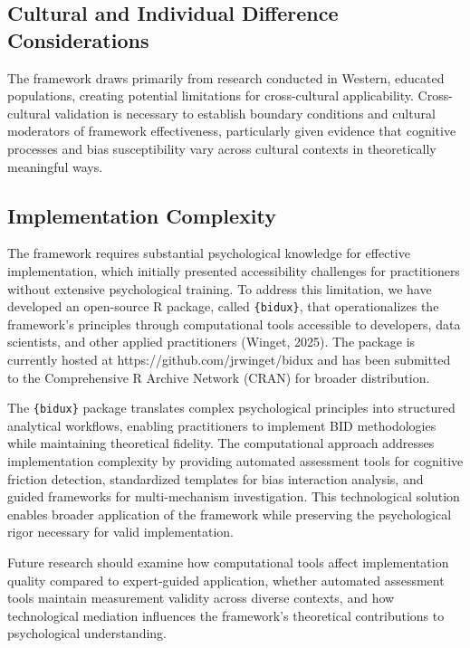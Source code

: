 \documentclass[
  authoryear,
  preprint]{elsarticle}
\begin{document}
\subsection{Cultural and Individual Difference
Considerations}\label{cultural-and-individual-difference-considerations}

The framework draws primarily from research conducted in Western,
educated populations, creating potential limitations for cross-cultural
applicability. Cross-cultural validation is necessary to establish
boundary conditions and cultural moderators of framework effectiveness,
particularly given evidence that cognitive processes and bias
susceptibility vary across cultural contexts in theoretically meaningful
ways.

\subsection{Implementation Complexity}\label{implementation-complexity}

The framework requires substantial psychological knowledge for effective
implementation, which initially presented accessibility challenges for
practitioners without extensive psychological training. To address this
limitation, we have developed an open-source R package, called
\texttt{\{bidux\}}, that operationalizes the framework's principles
through computational tools accessible to developers, data scientists,
and other applied practitioners (Winget, 2025). The package is currently
hosted at https://github.com/jrwinget/bidux and has been submitted to
the Comprehensive R Archive Network (CRAN) for broader distribution.

The \texttt{\{bidux\}} package translates complex psychological
principles into structured analytical workflows, enabling practitioners
to implement BID methodologies while maintaining theoretical fidelity.
The computational approach addresses implementation complexity by
providing automated assessment tools for cognitive friction detection,
standardized templates for bias interaction analysis, and guided
frameworks for multi-mechanism investigation. This technological
solution enables broader application of the framework while preserving
the psychological rigor necessary for valid implementation.

Future research should examine how computational tools affect
implementation quality compared to expert-guided application, whether
automated assessment tools maintain measurement validity across diverse
contexts, and how technological mediation influences the framework's
theoretical contributions to psychological understanding.
\end{document}

